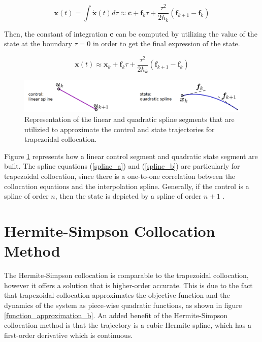\documentclass{thesisreport}
\begin{document}
 \begin{equation}
 	\bm{x}(t) = \int \dot{\bm{x}}(t) d \tau \approx \bm{c} + \bm{f}_k \tau + \frac{\tau^2}{2 h_k} (\bm{f}_{k+1}-\bm{f}_k)
 \end{equation}
 
 
Then, the constant of integration $\bm{c}$ can be computed by utilizing the value of the state at the boundary $\tau = 0$  in order to get the final expression of the state.

 \begin{equation}\label{spline_b}
 	\bm{x}(t) \approx \bm{x}_k + \bm{f}_k \tau + \frac{\tau^2}{2 h_k} (\bm{f}_{k+1}-\bm{f}_k)
 \end{equation} 

\newpage 
 
 \begin{figure}[h]
 \centering
 \includegraphics[width=\textwidth]{Images/Trajectory/Trapezoid_Rule}
 \caption{Representation of the linear and quadratic spline segments that are utilizied to approximate the control and state trajectories for trapezoidal collocation.}
 \label{trapezoid_collocation_state_control_fig}
 \end{figure}
 
 
 
\noindent Figure \ref{trapezoid_collocation_state_control_fig} represents how a linear control segment and quadratic state segment are built. The spline equations (\ref{spline_a}) and (\ref{spline_b}) are particularly for trapezoidal collocation, since there is a one-to-one correlation between the collocation equations and the interpolation spline. Generally, if the control is a spline of order $n$, then the state is depicted by a spline of order $n+1$ \cite{Betts2010}.
 
 

\section{Hermite-Simpson Collocation Method}

The Hermite-Simpson collocation is  comparable to the trapezoidal collocation, however it offers a solution that is higher-order accurate. This is due to the fact that trapezoidal collocation approximates the objective function and the dynamics of the system as piece-wise quadratic functions, as shown in figure \ref{function_approximation_b}. An added benefit of the Hermite-Simpson collocation method is that the trajectory is a cubic Hermite spline, which has a first-order derivative which is continuous.
\end{document}
